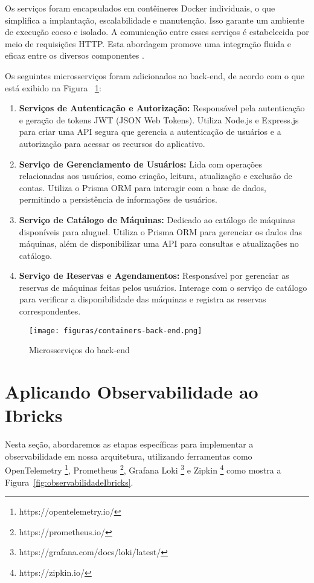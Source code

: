 \documentclass[12pt]{article}
\begin{document}
Os serviços foram encapsulados em contêineres Docker individuais, o que simplifica a implantação, escalabilidade e manutenção. Isso garante um ambiente de execução coeso e isolado. A comunicação entre esses serviços é estabelecida por meio de requisições HTTP. Esta abordagem promove uma integração fluida e eficaz entre os diversos componentes \cite{vase2015advantages}.

Os seguintes microsserviços foram adicionados ao back-end, de acordo com o que está exibido na Figura ~\ref{fig:microservico}:

\begin{enumerate}
    \item \textbf{Serviços de Autenticação e Autorização:} Responsável pela autenticação e geração de tokens JWT (JSON Web Tokens). Utiliza Node.js e Express.js para criar uma API segura que gerencia a autenticação de usuários e a autorização para acessar os recursos do aplicativo.
    \item \textbf{Serviço de Gerenciamento de Usuários:} Lida com operações relacionadas aos usuários, como criação, leitura, atualização e exclusão de contas. Utiliza o Prisma ORM para interagir com a base de dados, permitindo a persistência de informações de usuários.
    \item \textbf{Serviço de Catálogo de Máquinas:} Dedicado ao catálogo de máquinas disponíveis para aluguel. Utiliza o Prisma ORM para gerenciar os dados das máquinas, além de disponibilizar uma API para consultas e atualizações no catálogo.
    \item \textbf{Serviço de Reservas e Agendamentos:} Responsável por gerenciar as reservas de máquinas feitas pelos usuários. Interage com o serviço de catálogo para verificar a disponibilidade das máquinas e registra as reservas correspondentes.
\end{enumerate}

\begin{figure}[!htb]
\centering
\texttt{[image: figuras/containers-back-end.png]}
\caption{Microsserviços do back-end}
\label{fig:microservico}
\end{figure}

\section{Aplicando Observabilidade ao Ibricks}\label{sec:aplicacao}

Nesta seção, abordaremos as etapas específicas para implementar a observabilidade em nossa arquitetura, utilizando ferramentas como OpenTelemetry \footnote{https://opentelemetry.io/}, Prometheus \footnote{https://prometheus.io/}, Grafana Loki \footnote{https://grafana.com/docs/loki/latest/} e Zipkin \footnote{https://zipkin.io/} como mostra a Figura~\ref{fig:observabilidadeIbricks}.
\end{document}

